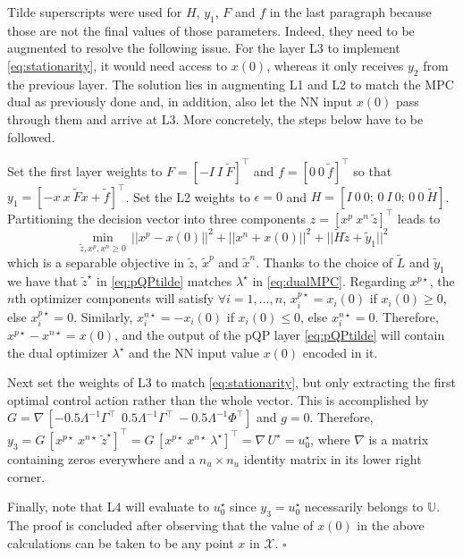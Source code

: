 Tilde superscripts were used for $H$, $y_1$, $F$ and $f$ in the last paragraph because those are not the final values of those parameters. Indeed, they need to be augmented to resolve the following issue. For the layer L3 to implement \eqref{eq:stationarity}, it would need access to $x(0)$, whereas it only receives $y_2$ from the previous layer. The solution lies in augmenting L1 and L2 to match the MPC dual as previously done and, in addition, also let the NN input $x(0)$ pass through them and arrive at L3. More concretely, the steps below have to be followed.

Set the first layer weights to $F = [-I \ I \ \tilde{F}]^\top$ and $f = [0 \ 0 \ \tilde{f}]^\top$ so that $y_1 = [-x \ x \ \tilde{F}x + \tilde{f}]^\top$. Set the L2 weights to $\epsilon = 0$ and $H = [I \ 0 \ 0; \,0 \ I \ 0; \, 0 \ 0 \ \tilde{H}]$. Partitioning the decision vector into three components $z = [x^p \ x^n \ \tilde{z}]^\top$ leads to
\begin{equation}
	\label{eq:pQPtilde}
	\min_{\tilde{z},x^p,x^n \geq 0} \, ||x^p - x(0)||^{2} + ||x^n + x(0)||^{2} + ||\tilde{H}\tilde{z} + \tilde{y}_1||^{2} 
\end{equation}
which is a separable objective in $\tilde{z}$, $\tilde{x}^p$ and $\tilde{x}^n$. Thanks to the choice of $\tilde{L}$ and $\tilde{y}_1$ we have that $\tilde{z}^\star$ in \eqref{eq:pQPtilde} matches $\lambda^\star$ in \eqref{eq:dualMPC}. Regarding $x^{p\star}$, the $n$th optimizer components will satisfy $\forall i = 1,\dots,n$, $x^{p\star}_i = x_i(0)$ if $x_i(0) \geq 0$, else $x^{p\star}_i = 0$. Similarly, $x^{n\star}_i = -x_i(0)$ if $x_i(0) \leq 0$, else $x^{n\star}_i = 0$. Therefore, $x^{p\star} - x^{n\star} = x(0)$, and the output of the pQP layer \eqref{eq:pQPtilde} will contain the dual optimizer $\lambda^\star$ and the NN input value $x(0)$ encoded in it.

Next set the weights of L3 to match \eqref{eq:stationarity}, but only extracting the first optimal control action rather than the whole vector. This is accomplished by $G = \nabla\, [-0.5 \Lambda^{-1}\Gamma^\top \ \ 0.5\Lambda^{-1}\Gamma^\top \ - 0.5 \Lambda^{-1}\Phi^\top ]$ and $g = 0$. Therefore, $y_3 = G \, [x^{p \star} \ x^{n\star} \ \tilde{z}^\star ]^\top = G \, [x^{p \star} \ x^{n\star} \ \lambda^\star]^\top = \nabla\, U^\star = u_0^\star$, where $\nabla$ is a matrix containing zeros everywhere and a $n_u \times n_u$ identity matrix in its lower right corner.

Finally, note that L4 will evaluate to $u_0^\star$ since $y_3 = u_0^\star$ necessarily belongs to $\mathbb{U}$. The proof is concluded after observing that the value of $x(0)$ in the above calculations can be taken to be any point $x$ in $\mathcal{X}$. $\square$

